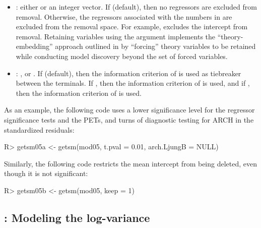 \documentclass[article,nojss]{jss}
\begin{document}
\begin{itemize}
\item {}: either  or an integer vector. If
   (default), then no regressors are excluded from
  removal. Otherwise, the regressors associated with the numbers in
   are excluded from the removal space. For example,
   excludes the intercept from removal. Retaining
  variables using the  argument implements the
  ``theory-embedding'' approach outlined in \cite{hendry2015model} by
  ``forcing'' theory variables to be retained while conducting model
  discovery beyond the set of forced variables.
	
\item{}: ,  or . If
   (default), then the information criterion of
  \cite{Schwarz1978} is used as tiebreaker between the terminals. If
  , then the information criterion of \cite{Akaike1974} is
  used, and if , then the information criterion of
  \cite{HannanQuinn1979} is used.

\end{itemize}
%
As an example, the following code uses a lower significance level for the regressor significance tests and the PETs, and turns of diagnostic testing for ARCH in the standardized residuals:
%
\begin{CodeChunk}
\begin{CodeInput}
R> getsm05a <- getsm(mod05, t.pval = 0.01, arch.LjungB = NULL)
\end{CodeInput}
\end{CodeChunk}
%
Similarly, the following code restricts the mean intercept from being deleted, even though it is not significant:
%
\begin{CodeChunk}
\begin{CodeInput}
R> getsm05b <- getsm(mod05, keep = 1)
\end{CodeInput}
\end{CodeChunk}
\subsection[getsv: Modeling the log-variance]{: Modeling the log-variance}
\label{subsec:getsv:modeling:the:log-variance}
\end{document}
